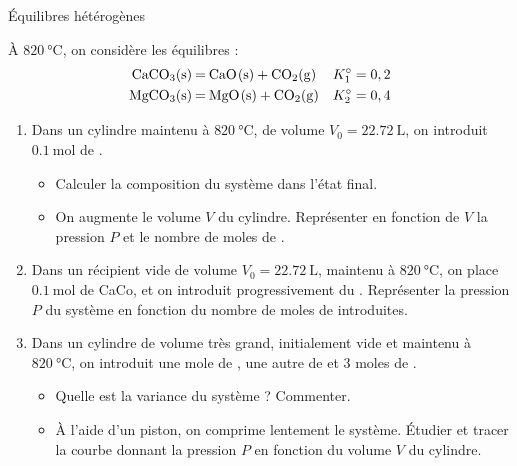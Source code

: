 \documentclass[french, a4paper, 11pt]{article}
\begin{document}
\begin{cadre}{Équilibres hétérogènes}

  À $\SI{820}{\celsius}$, on considère les équilibres :
  \begin{align*}
    \ce{CaCO3(s) &= CaO(s) + CO2(g)}  &K^\circ_1=0,2 \\
    \ce{MgCO3(s) &= MgO(s) + CO2(g)}  &K^\circ_2=0,4
  \end{align*}
  \begin{enumerate}
    \item Dans un cylindre maintenu à $\SI{820}{\celsius}$, de volume $V_0=\SI{22.72}{\liter}$,
      on introduit $\SI{0.1}{\mol}$ de .
      \begin{itemize}
        \item Calculer la composition du système dans l'état final.
        \item On augmente le volume $V$ du cylindre. Représenter en fonction de $V$ la pression $P$ et le nombre de moles de .
      \end{itemize}
    \item Dans un récipient vide de volume $V_0=\SI{22,72}{\liter}$, maintenu à $\SI{820}{\celsius}$, on place $\SI{0,1}{\mol}$ de CaCo, et on introduit progressivement du .
    Représenter la pression $P$ du système en fonction du nombre de moles de  introduites.
    \item Dans un cylindre de volume très grand, initialement vide et maintenu à $\SI{820}{\celsius}$, on introduit une mole de , une autre de  et 3 moles de .
      \begin{itemize}
        \item Quelle est la variance du système ? Commenter.
        \item À l'aide d'un piston, on comprime lentement le système.
          Étudier et tracer la courbe donnant la pression $P$ en fonction du volume $V$ du cylindre.
      \end{itemize}
  \end{enumerate}

\end{cadre}
\end{document}
